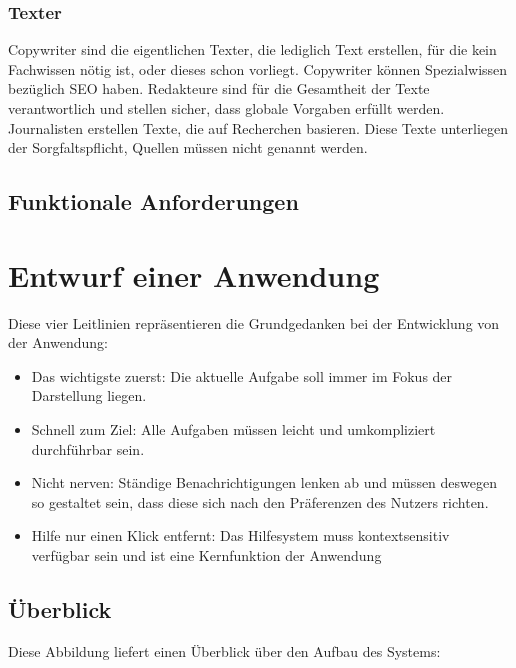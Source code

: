 \subsubsection{Texter}

Copywriter sind die eigentlichen Texter, die lediglich Text erstellen, für die kein Fachwissen nötig ist, oder dieses schon vorliegt. Copywriter können Spezialwissen bezüglich SEO haben. Redakteure sind für die Gesamtheit der Texte verantwortlich und stellen sicher, dass globale Vorgaben erfüllt werden. Journalisten erstellen Texte, die auf Recherchen basieren. Diese Texte unterliegen der Sorgfaltspflicht, Quellen müssen nicht genannt werden. 

\subsection{Funktionale Anforderungen}

\TODO

\section{Entwurf einer Anwendung}

Diese vier Leitlinien repräsentieren die Grundgedanken bei der Entwicklung von der Anwendung:

\begin{itemize}
\item{Das wichtigste zuerst: Die aktuelle Aufgabe soll immer im Fokus der Darstellung liegen.}
\item{Schnell zum Ziel: Alle Aufgaben müssen leicht und umkompliziert durchführbar sein.}
\item{Nicht nerven: Ständige Benachrichtigungen lenken ab und müssen deswegen so gestaltet sein, dass diese sich nach den Präferenzen des Nutzers richten.}
\item{Hilfe nur einen Klick entfernt: Das Hilfesystem muss kontextsensitiv verfügbar sein und ist eine Kernfunktion der Anwendung}
\end{itemize}

\subsection{Überblick}

Diese Abbildung liefert einen Überblick über den Aufbau des Systems:

